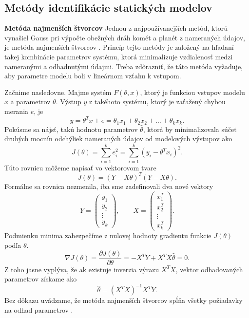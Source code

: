 \subsection{Metódy identifikácie statických modelov}
\textbf{Metóda najmenších štvorcov}
\newline
Jednou z najpoužívanejších metód, ktorú vynašiel Gauss pri výpočte obežných dráh komét a planét z nameraných údajov, je metóda najmenších štvorcov \cite{hostetter:recursive_est:1987}. Princíp tejto metódy je založený na hľadaní takej kombinácie parametrov systému, ktorá minimalizuje vzdialenosť medzi nameranými a odhadnutými údajmi. Treba zdôrazniť, že táto metóda vyžaduje, aby parametre modelu boli v lineárnom vzťahu k vstupom.

Začnime nasledovne. Majme systém $ F(\theta, x) $, ktorý je funkciou vstupov modelu $ x $ a parametrov $ \theta $. Výstup $ y $ z takéhoto systému, ktorý je zaťažený chybou merania $ e $, je
\begin{equation}
	y = \theta^T x + e = \theta_1x_1 + \theta_2x_2 + \dots + \theta_kx_k.
\end{equation}
Pokúsme sa nájsť, takú hodnotu parametrov $ \hat{\theta} $, ktorá by minimalizovala súčet druhých mocnín odchýliek nameraných údajov od modelových výstupov ako
\begin{equation}
	J\left(\theta\right) = \sum_{i=1}^{k} e_i^2 = \sum_{i=1}^{k} \left(y_i - \theta^T x_i\right)^2.
\end{equation}
Túto rovnicu môžeme napísať vo vektorovom tvare
\begin{equation}
	J\left(\theta\right) = \left(Y - X\theta \right)^T \left(Y - X\theta \right).
\end{equation} 
Formálne sa rovnica nezmenila, iba sme zadefinovali dva nové vektory
\begin{equation}
	Y = \begin{pmatrix}
			y_1 \\
			y_2 \\
			\vdots \\
			y_k
		\end{pmatrix}, \qquad
	X = \begin{pmatrix}
			x_1^T \\
			x_2^T \\
			\vdots \\
			x_k^T
		\end{pmatrix}.
\end{equation}
Podmienku minima zabezpečíme z nulovej hodnoty gradientu funkcie $ J(\theta) $ podľa $ \theta $.
\begin{equation}
	\nabla J \left(\theta\right) = \frac{\partial J \left(\theta\right)}{\partial \theta} = -X^T Y + X^T X\hat{\theta} = 0.
\end{equation}
Z toho jasne vyplýva, že ak existuje inverzia výrazu $ X^T X $, vektor odhadovaných parametrov získame ako 
\begin{equation}
	\hat{\theta} = \left(X^T X\right)^{-1}X^T Y.
\end{equation}
Bez dôkazu uvádzame, že metóda najmenších štvorcov spĺňa všetky požiadavky na odhad parametrov \cite{fikar:identifikacia:1999}.

